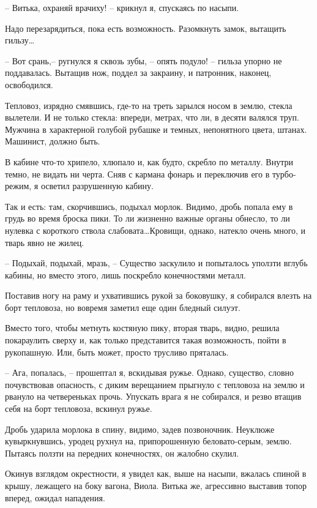 \documentclass[a4paper]{book}
\begin{document}
-- Витька, охраняй врачиху! -- крикнул я, спускаясь по насыпи. 

Надо перезарядиться, пока есть возможность. Разомкнуть замок, вытащить гильзу\ldots 

-- Вот срань,-- ругнулся я сквозь зубы, -- опять подуло! -- гильза упорно не поддавалась. Вытащив нож, поддел за закраину, и патронник, наконец, освободился.

Тепловоз, изрядно смявшись, где-то на треть зарылся носом в землю, стекла вылетели. И не только стекла: впереди, метрах, что ли, в десяти валялся труп. Мужчина в характерной голубой рубашке и темных, непонятного цвета, штанах. Машинист, должно быть. 

В кабине что-то хрипело, хлюпало и, как будто, скребло по металлу. Внутри темно, не видать ни черта. Сняв с кармана фонарь и переключив его в турбо-режим, я осветил разрушенную кабину. 

Так и есть: там, скорчившись, подыхал морлок. Видимо, дробь попала ему в грудь во время броска пики. То ли жизненно важные органы обнесло, то ли нулевка с короткого ствола слабовата\ldots Кровищи, однако, натекло очень много, и тварь явно не жилец.

-- Подыхай, подыхай, мразь, --  Существо заскулило и попыталось уползти вглубь кабины, но вместо этого, лишь поскребло конечностями металл. 

Поставив ногу на раму и ухватившись рукой за боковушку, я собирался влезть на борт тепловоза, но вовремя заметил еще один бледный силуэт. 

Вместо того, чтобы метнуть костяную пику, вторая тварь, видно, решила покараулить сверху и, как только представится такая возможность, пойти в рукопашную. Или, быть может, просто трусливо пряталась.  

-- Ага, попалась, -- прошептал я, вскидывая ружье. Однако, существо, словно почувствовав опасность, с диким верещанием прыгнуло с тепловоза на землю и рвануло на четвереньках прочь. Упускать врага я не собирался, и резво втащив себя на борт тепловоза, вскинул ружье. 

Дробь ударила морлока в спину, видимо, задев позвоночник. Неуклюже кувыркнувшись, уродец рухнул на, припорошенную беловато-серым, землю. Пытаясь ползти на передних конечностях, он жалобно скулил.

Окинув взглядом окрестности, я увидел как, выше на насыпи, вжалась спиной в крышу, лежащего на боку вагона, Виола. Витька же, агрессивно выставив топор вперед, ожидал нападения.
\end{document}
